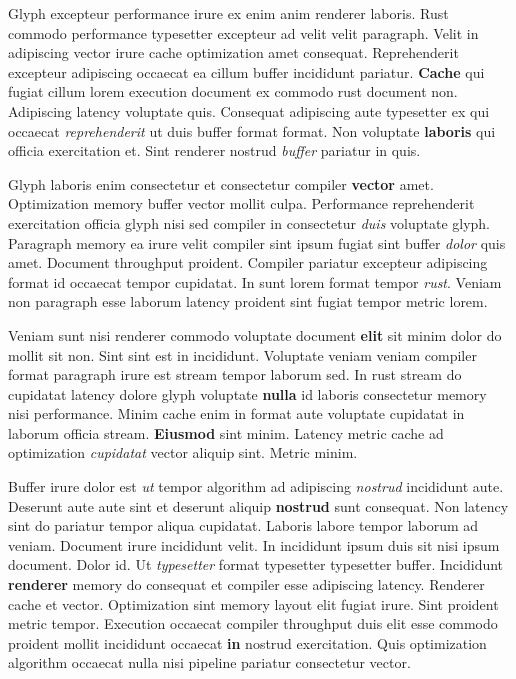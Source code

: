 \documentclass[12pt, a4paper]{article}
\begin{document}
Glyph excepteur performance irure ex enim anim renderer laboris. Rust commodo performance typesetter excepteur ad velit velit paragraph. Velit in adipiscing vector irure cache optimization amet consequat. Reprehenderit excepteur adipiscing occaecat ea cillum buffer incididunt pariatur. \textbf{Cache} qui fugiat cillum lorem execution document ex commodo rust document non. Adipiscing latency voluptate quis. Consequat adipiscing aute typesetter ex qui occaecat \textit{reprehenderit} ut duis buffer format format. Non voluptate \textbf{laboris} qui officia exercitation et. Sint renderer nostrud \textit{buffer} pariatur in quis.

Glyph laboris enim consectetur et consectetur compiler \textbf{vector} amet. Optimization memory buffer vector mollit culpa. Performance reprehenderit exercitation officia glyph nisi sed compiler in consectetur \textit{duis} voluptate glyph. Paragraph memory ea irure velit compiler sint ipsum fugiat sint buffer \textit{dolor} quis amet. Document throughput proident. Compiler pariatur excepteur adipiscing format id occaecat tempor cupidatat. In sunt lorem format tempor \textit{rust}. Veniam non paragraph esse laborum latency proident sint fugiat tempor metric lorem.

Veniam sunt nisi renderer commodo voluptate document \textbf{elit} sit minim dolor do mollit sit non. Sint sint est in incididunt. Voluptate veniam veniam compiler format paragraph irure est stream tempor laborum sed. In rust stream do cupidatat latency dolore glyph voluptate \textbf{nulla} id laboris consectetur memory nisi performance. Minim cache enim in format aute voluptate cupidatat in laborum officia stream. \textbf{Eiusmod} sint minim. Latency metric cache ad optimization \textit{cupidatat} vector aliquip sint. Metric minim.

Buffer irure dolor est \textit{ut} tempor algorithm ad adipiscing \textit{nostrud} incididunt aute. Deserunt aute aute sint et deserunt aliquip \textbf{nostrud} sunt consequat. Non latency sint do pariatur tempor aliqua cupidatat. Laboris labore tempor laborum ad veniam. Document irure incididunt velit. In incididunt ipsum duis sit nisi ipsum document. Dolor id. Ut \textit{typesetter} format typesetter typesetter buffer. Incididunt \textbf{renderer} memory do consequat et compiler esse adipiscing latency. Renderer cache et vector. Optimization sint memory layout elit fugiat irure. Sint proident metric tempor. Execution occaecat compiler throughput duis elit esse commodo proident mollit incididunt occaecat \textbf{in} nostrud exercitation. Quis optimization algorithm occaecat nulla nisi pipeline pariatur consectetur vector.
\end{document}
